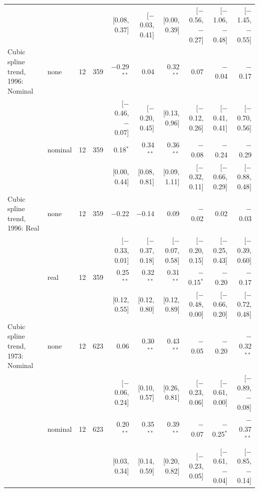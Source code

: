 \begin{table}[tp]
{\begin{tabular}{llcrrrrrrr}
 & & & & {\scriptsize [0.08, 0.37]} & {\scriptsize [$-$0.03, 0.41]} & {\scriptsize [0.00, 0.39]} & {\scriptsize [$-$0.56, $-$0.27]} & {\scriptsize [$-$1.06, $-$0.48]} & {\scriptsize [$-$1.45, $-$0.55]}\\
\addlinespace
Cubic spline trend, 1996: Nominal & none & 12 & 359 & $-$0.29$^{**}$ & 0.04 & 0.32$^{**}$ & 0.07 & $-$0.04 & $-$0.17\\
 & & & & {\scriptsize [$-$0.46, $-$0.07]} & {\scriptsize [$-$0.20, 0.45]} & {\scriptsize [0.13, 0.96]} & {\scriptsize [$-$0.12, 0.26]} & {\scriptsize [$-$0.41, 0.41]} & {\scriptsize [$-$0.70, 0.56]}\\
 & nominal & 12 & 359 & 0.18$^{*}$ & 0.34$^{**}$ & 0.36$^{**}$ & $-$0.08 & $-$0.24 & $-$0.29\\
 & & & & {\scriptsize [0.00, 0.44]} & {\scriptsize [0.08, 0.81]} & {\scriptsize [0.09, 1.11]} & {\scriptsize [$-$0.32, 0.11]} & {\scriptsize [$-$0.66, 0.29]} & {\scriptsize [$-$0.88, 0.48]}\\
\addlinespace
Cubic spline trend, 1996: Real & none & 12 & 359 & $-$0.22 & $-$0.14 & 0.09 & $-$0.02 & 0.02 & $-$0.03\\
 & & & & {\scriptsize [$-$0.33, 0.01]} & {\scriptsize [$-$0.37, 0.18]} & {\scriptsize [$-$0.07, 0.58]} & {\scriptsize [$-$0.20, 0.15]} & {\scriptsize [$-$0.25, 0.43]} & {\scriptsize [$-$0.39, 0.60]}\\
 & real & 12 & 359 & 0.25$^{**}$ & 0.32$^{**}$ & 0.31$^{**}$ & $-$0.15$^{*}$ & $-$0.20 & $-$0.17\\
 & & & & {\scriptsize [0.12, 0.55]} & {\scriptsize [0.12, 0.80]} & {\scriptsize [0.12, 0.89]} & {\scriptsize [$-$0.48, 0.00]} & {\scriptsize [$-$0.66, 0.20]} & {\scriptsize [$-$0.72, 0.48]}\\
\addlinespace
Cubic spline trend, 1973: Nominal & none & 12 & 623 & 0.06 & 0.30$^{**}$ & 0.43$^{**}$ & $-$0.05 & $-$0.20 & $-$0.32$^{**}$\\
 & & & & {\scriptsize [$-$0.06, 0.24]} & {\scriptsize [0.10, 0.57]} & {\scriptsize [0.26, 0.81]} & {\scriptsize [$-$0.23, 0.06]} & {\scriptsize [$-$0.61, 0.00]} & {\scriptsize [$-$0.89, $-$0.08]}\\
 & nominal & 12 & 623 & 0.20$^{**}$ & 0.35$^{**}$ & 0.39$^{**}$ & $-$0.07 & $-$0.25$^{*}$ & $-$0.37$^{**}$\\
 & & & & {\scriptsize [0.03, 0.34]} & {\scriptsize [0.14, 0.59]} & {\scriptsize [0.20, 0.82]} & {\scriptsize [$-$0.23, 0.05]} & {\scriptsize [$-$0.61, $-$0.04]} & {\scriptsize [$-$0.85, $-$0.14]}\\

\end{tabular}}
\end{table}

